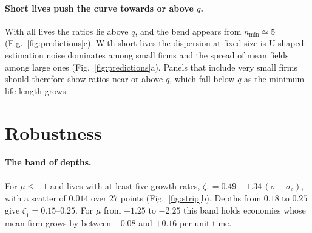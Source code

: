 \documentclass[pre,twocolumn,superscriptaddress,nofootinbib]{revtex4-2}
\begin{document}
\paragraph{Short lives push the curve towards or above $q$.}  With all lives the ratios lie above $q$, and the
bend appears from $n_{\min}\simeq5$ (Fig.~\ref{fig:predictions}c).  With short lives the dispersion at fixed size
is U-shaped: estimation noise dominates among small firms and the spread of mean fields among large ones
(Fig.~\ref{fig:predictions}a).  Panels that include very small firms \cite{fontanelli2025} should therefore show
ratios near or above $q$, which fall below $q$ as the minimum life length grows.

\section{Robustness}
\label{app:robust}

\paragraph{The band of depths.}  For $\mu\le-1$ and lives with at least five growth rates,
$\zeta_1=0.49-1.34\,(\sigma-\sigma_c)$, with a scatter of $0.014$ over $27$ points (Fig.~\ref{fig:strip}b).  Depths
from $0.18$ to $0.25$ give $\zeta_1=0.15$--$0.25$.  For $\mu$ from $-1.25$ to $-2.25$ this band holds economies
whose mean firm grows by between $-0.08$ and $+0.16$ per unit time.
\end{document}
